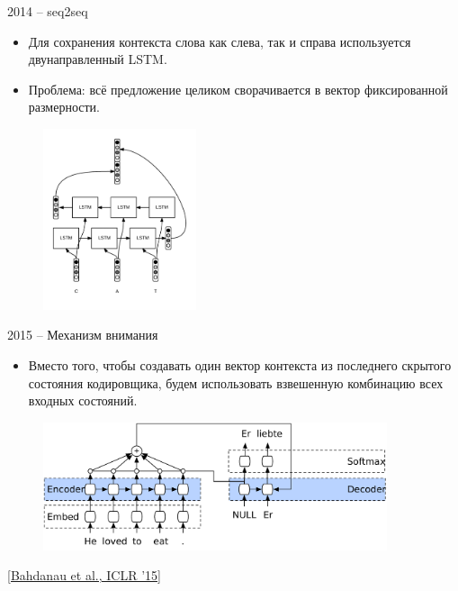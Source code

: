 \begin{frame}[c]{2014 -- seq2seq}
\begin{itemize}
	[square]
	\item Для сохранения контекста слова как слева, так и справа используется двунаправленный LSTM.
	\item Проблема: всё предложение целиком сворачивается в вектор фиксированной размерности.
\end{itemize}
\begin{figure}
	\centering
	\includegraphics[width=0.4\textwidth]{figures/bilstm.png}
\end{figure}
\end{frame}

\begin{frame}[c]{2015 -- Механизм внимания}
\begin{itemize}
	[square]
	\item Вместо того, чтобы создавать один вектор контекста из последнего скрытого состояния кодировщика, будем использовать взвешенную комбинацию всех входных состояний.
\end{itemize}
\begin{figure}
	\centering
	\includegraphics[width=0.9\textwidth]{figures/qseq2seq_a.pdf}
\end{figure}
\let\thefootnote\footnote{\href{http://arxiv.org/abs/1409.0473}{\color[rgb]{0.5,0.5,0.5} [Bahdanau et al., ICLR ’15]}}
\end{frame}

